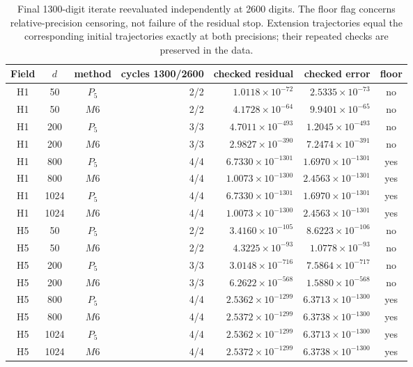 \begin{table}[htbp]
\centering\scriptsize
\setlength{\tabcolsep}{3pt}
\caption{Final 1300-digit iterate reevaluated independently at 2600 digits. The floor flag concerns relative-precision censoring, not failure of the residual stop. Extension trajectories equal the corresponding initial trajectories exactly at both precisions; their repeated checks are preserved in the data.}\label{tab:ext-precision-external6}
\begin{tabular}{cccrrrc}\toprule
Field & $d$ & method & cycles 1300/2600 & checked residual & checked error & floor\\\midrule
H1 & 50 & $P_{5}$ & 2/2 & $1.0118\times10^{-72}$ & $2.5335\times10^{-73}$ & no\\
H1 & 50 & $M6$ & 2/2 & $4.1728\times10^{-64}$ & $9.9401\times10^{-65}$ & no\\
H1 & 200 & $P_{5}$ & 3/3 & $4.7011\times10^{-493}$ & $1.2045\times10^{-493}$ & no\\
H1 & 200 & $M6$ & 3/3 & $2.9827\times10^{-390}$ & $7.2474\times10^{-391}$ & no\\
H1 & 800 & $P_{5}$ & 4/4 & $6.7330\times10^{-1301}$ & $1.6970\times10^{-1301}$ & yes\\
H1 & 800 & $M6$ & 4/4 & $1.0073\times10^{-1300}$ & $2.4563\times10^{-1301}$ & yes\\
H1 & 1024 & $P_{5}$ & 4/4 & $6.7330\times10^{-1301}$ & $1.6970\times10^{-1301}$ & yes\\
H1 & 1024 & $M6$ & 4/4 & $1.0073\times10^{-1300}$ & $2.4563\times10^{-1301}$ & yes\\
H5 & 50 & $P_{5}$ & 2/2 & $3.4160\times10^{-105}$ & $8.6223\times10^{-106}$ & no\\
H5 & 50 & $M6$ & 2/2 & $4.3225\times10^{-93}$ & $1.0778\times10^{-93}$ & no\\
H5 & 200 & $P_{5}$ & 3/3 & $3.0148\times10^{-716}$ & $7.5864\times10^{-717}$ & no\\
H5 & 200 & $M6$ & 3/3 & $6.2622\times10^{-568}$ & $1.5880\times10^{-568}$ & no\\
H5 & 800 & $P_{5}$ & 4/4 & $2.5362\times10^{-1299}$ & $6.3713\times10^{-1300}$ & yes\\
H5 & 800 & $M6$ & 4/4 & $2.5372\times10^{-1299}$ & $6.3738\times10^{-1300}$ & yes\\
H5 & 1024 & $P_{5}$ & 4/4 & $2.5362\times10^{-1299}$ & $6.3713\times10^{-1300}$ & yes\\
H5 & 1024 & $M6$ & 4/4 & $2.5372\times10^{-1299}$ & $6.3738\times10^{-1300}$ & yes\\
\bottomrule\end{tabular}
\end{table}
\FloatBarrier
